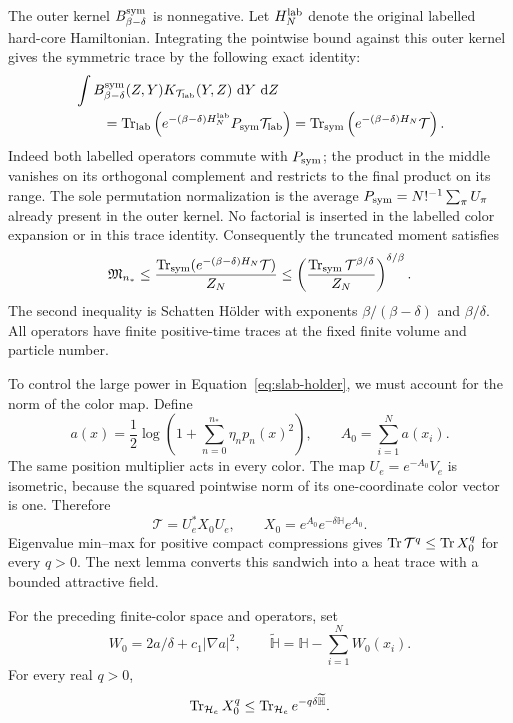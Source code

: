 The outer kernel $B_{\beta-\delta}^{\rm sym}$ is
nonnegative.  Let $H_N^{\rm lab}$ denote the original
labelled hard-core Hamiltonian.  Integrating the pointwise
bound against this outer kernel gives the symmetric trace
by the following exact identity:
\begin{align*}
 &\int B_{\beta-\delta}^{\rm sym}(Z,Y)
          K_{\mathcal T_{\rm lab}}(Y,Z)\,\,\mathrm d Y\,\,\mathrm d Z\\
 &\qquad=\operatorname{Tr}_{\rm lab}\left(
    e^{-(\beta-\delta)H_N^{\rm lab}}
                      P_{\rm sym}\mathcal T_{\rm lab}\right)
 =\operatorname{Tr}_{\rm sym}\left(e^{-(\beta-\delta)H_N}\mathcal T\right).
\end{align*}
Indeed both labelled operators commute with $P_{\rm sym}$;
the product in the middle vanishes on its orthogonal
complement and restricts to the final product on its range.
The sole permutation normalization is the average
$P_{\rm sym}=N!^{-1}\sum_\pi U_\pi$ already present
in the outer kernel.  No factorial is inserted in the
labelled color expansion or in this trace identity.
Consequently the truncated moment satisfies
\begin{equation}\label{eq:slab-holder}
 \mathfrak M_{n_*}
 \le\frac{\operatorname{Tr}_{\rm sym}
          (e^{-(\beta-\delta)H_N}\mathcal T)}{Z_N}
 \le\left(\frac{\operatorname{Tr}_{\rm sym}\mathcal T^{\beta/\delta}}
                   {Z_N}\right)^{\delta/\beta}.
\end{equation}
The second inequality is Schatten H\"older with exponents
$\beta/(\beta-\delta)$ and $\beta/\delta$.
All operators have finite positive-time traces at the
fixed finite volume and particle number.

To control the large power in Equation~\eqref{eq:slab-holder},
we must account for the norm of the color map.  Define
\begin{equation}\label{eq:color-normalization}
 a(x)=\frac12\log\left(1+\sum_{n=0}^{n_*}\eta_np_n(x)^2\right),
 \qquad A_0=\sum_{i=1}^N a(x_i).
\end{equation}
The same position multiplier acts in every color.
The map $U_e=e^{-A_0}V_e$ is isometric, because the
squared pointwise norm of its one-coordinate color vector
is one.  Therefore
\[
 \mathcal T=U_e^*X_0U_e,
 \qquad X_0=e^{A_0}e^{-\delta\mathbb H}e^{A_0}.
\]
Eigenvalue min--max for positive compact compressions gives
$\operatorname{Tr}\mathcal T^q\le\operatorname{Tr} X_0^q$ for every $q>0$.
The next lemma converts this sandwich into a heat trace
with a bounded attractive field.

\begin{lemma}\label{lem:sandwich}
For the preceding finite-color space and operators, set
\[
 W_0=2a/\delta+c_1|\nabla a|^2,\qquad
 \widetilde{\mathbb H}=\mathbb H-\sum_{i=1}^N W_0(x_i).
\]
For every real $q>0$,
\begin{equation}\label{eq:all-q-sandwich}
 \operatorname{Tr}_{\mathcal H_e}X_0^q
 \le\operatorname{Tr}_{\mathcal H_e}e^{-q\delta\widetilde{\mathbb H}}.
\end{equation}
\end{lemma}

